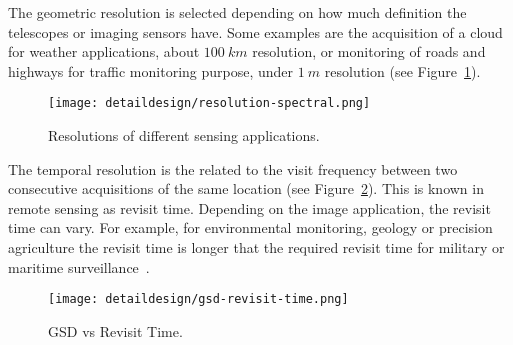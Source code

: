 

The geometric resolution is selected depending on how much definition the
telescopes or imaging sensors have. Some examples are the acquisition of a cloud
for weather applications, about $100~km$ resolution, or monitoring of roads and
highways for traffic monitoring purpose, under $1~m$ resolution (see Figure~\ref{fig:intr-resolution-spectral}).

\begin{figure}[!h]
\begin{center}
\texttt{[image: detaildesign/resolution-spectral.png]}
\caption{Resolutions of different sensing applications.}
\label{fig:intr-resolution-spectral}
\end{center}
\end{figure}

The temporal resolution is the related to the visit frequency between two
consecutive acquisitions of the same location (see Figure~\ref{fig:intr-gsd-revisit-time}). This is known in remote sensing
as revisit time. Depending on the
image application, the revisit time can vary. For example, for environmental
monitoring, geology or precision agriculture the revisit time is longer that the
required revisit time for military or maritime surveillance~\cite{Sandau2009}.

\begin{figure}[!h]
\begin{center}
\texttt{[image: detaildesign/gsd-revisit-time.png]}
\caption{GSD vs Revisit Time.}
\label{fig:intr-gsd-revisit-time}
\end{center}
\end{figure}

